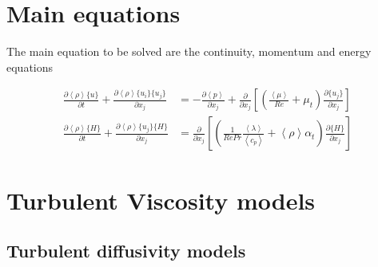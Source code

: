 \documentclass[paper=a4, fontsize=12pt]{scrartcl} %
\newcommand{\rave}[1]{\left<{#1}\right>}
\newcommand{\fave}[1]{\{{#1}\}}
\newcommand{\fpd}[2]{\frac{\partial #1}{\partial {#2}}}
\begin{document}
\section{Main equations}

The main equation to be solved are the continuity, momentum and energy equations

\begin{equation}
\begin{split}
\fpd{\rave{\rho}\fave{u}}{t} + \fpd{\rave{\rho}\fave{u_i}\fave{u_j}}{x_j} &= -\fpd{\rave{p}}{x_j}+\fpd{}{x_j}\left[\left(\frac{\rave{\mu}}{Re}+\mu_t\right)\fpd{\fave{u_j}}{x_j}\right] \\
\fpd{\rave{\rho}\fave{H}}{t} + \fpd{\rave{\rho}\fave{u_j}\fave{H}}{x_j} &= \fpd{}{x_j}\left[\left(\frac{1}{Re Pr}\frac{\rave{\lambda}}{\rave{c_p}}+\rave{\rho}\alpha_t\right)\fpd{\fave{H}}{x_j}\right]
\end{split}
\end{equation}


\section{Turbulent Viscosity models}







\subsection{Turbulent diffusivity models}




{}

\end{document}
